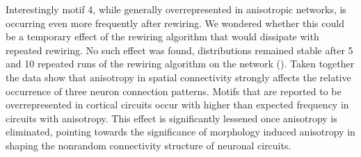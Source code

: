 Interestingly motif 4, while generally overrepresented in anisotropic
networks, is occurring even more frequently after rewiring. We
wondered whether this could be a temporary effect of the rewiring
algorithm that would dissipate with repeated rewiring. No such effect
was found, distributions remained stable after 5 and 10 repeated runs
of the rewiring algorithm on the network
(). Taken together the data show that
anisotropy in spatial connectivity strongly affects the relative
occurrence of three neuron connection patterns. Motifs that are
reported to be overrepresented in cortical circuits occur with higher
than expected frequency in circuits with anisotropy. This effect is
significantly lessened once anisotropy is eliminated, pointing towards
the significance of morphology induced anisotropy in shaping the
nonrandom connectivity structure of neuronal circuits.












